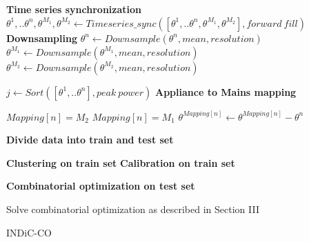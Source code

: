 \documentclass[conference]{IEEEtran}
\begin{document}
\begin{algorithm}[ht!]
\DontPrintSemicolon %
\BlankLine
\textbf{Time series synchronization}\;
\BlankLine
\nl$\theta^1,..\theta^n,\theta^{M_1},\theta^{M_2} \gets Timeseries\_sync([\theta^1,..\theta^n,\theta^{M_1},\theta^{M_2}],forward\: fill)$\;
\BlankLine
\textbf{Downsampling}
\BlankLine
\nl {}
	{
	$\theta^n \gets Downsample(\theta^n,mean,resolution)$\;
	}
\nl $\theta^{M_1} \gets Downsample(\theta^{M_1},mean,resolution)$\;
\nl $\theta^{M_2} \gets Downsample(\theta^{M_2},mean,resolution)$\;


\nl $j \gets Sort([\theta^1,..\theta^n],peak\: power)$\;
\BlankLine
\textbf{Appliance to Mains mapping}\;
\BlankLine
\nl {}
	{
	
\nl	{} 
		{ $Mapping[n]=M_2$\;		
		}  
\nl	{}
		{ $Mapping[n]=M_1$\;
		}
\nl	{}
	\nl	$\theta^{Mapping[n]} \gets \theta^{Mapping[n]} - \theta^n $ \;
	}
	\BlankLine
	\textbf{Divide data into train and test set}\;
	\BlankLine
	
		
		\BlankLine
		\textbf{Clustering on train set}\;
		\BlankLine
	\nl	{}
	\BlankLine
	\textbf{Calibration on train set} \;
	\BlankLine
\nl	{}


\BlankLine
\textbf{Combinatorial optimization on test set} \;
\BlankLine	
	
\nl Solve combinatorial optimization as described in Section III

\nl {}\;
\caption{INDiC-CO}
\label{algo:main}

\end{algorithm}
\end{document}
